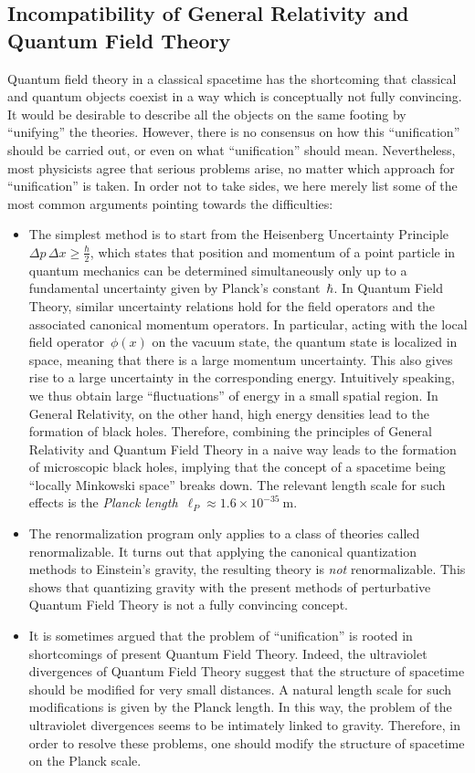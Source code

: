 \documentclass[reqno,11pt]{amsart}
\numberwithin{equation}{section}
\newcommand{\1}{\mbox{\rm 1 \hspace{-1.05 em} 1}}
\newcommand{\bitem}{\begin{itemize}[leftmargin=2.5em]}
\newcommand{\eitem}{\end{itemize}}
\newcommand{\itemD}{\item[{\raisebox{0.125em}{\tiny $\blacktriangleright$}}]}
\begin{document}
\subsection{Incompatibility of General Relativity and Quantum Field Theory} \label{secinconsist}
Quantum field theory in a classical spacetime has the shortcoming that
classical and quantum objects coexist in a way which is conceptually not fully convincing.
It would be desirable to describe all the objects on the same footing
by ``unifying'' the theories. However, there is no consensus on how this
``unification'' should be carried out,
or even on what ``unification'' should mean.
Nevertheless, most physicists agree that serious problems arise,
no matter which approach for ``unification'' is taken.
In order not to take sides, we here merely list some of the most common
arguments pointing towards the difficulties:
\bitem
\itemD The simplest method is to start from the Heisenberg Uncertainty Principle
$\Delta p \, \Delta x \geq \frac{\hbar}{2}$, which states that position and
momentum of a point particle in quantum mechanics can be determined
simultaneously only up to a fundamental uncertainty given by Planck's
constant~$\hbar$. In Quantum Field Theory, similar uncertainty relations hold
for the field operators and the associated canonical momentum operators. In particular,
acting with the local field operator~$\phi(x)$ on the vacuum state,
the quantum state is localized in space, meaning that there is
a large momentum uncertainty. This also gives rise to a large
uncertainty in the corresponding energy. Intuitively speaking, we thus obtain
large ``fluctuations'' of energy in a small spatial region.
In General Relativity, on the other hand, high energy densities lead to
the formation of black holes. Therefore, combining the principles
of General Relativity and Quantum Field Theory in a naive way
leads to the formation of microscopic black holes, implying that the
concept of a spacetime being ``locally Minkowski space'' breaks down.
The relevant length scale for such effects is the 
{\em{Planck length}}~$\ell_P \approx 1.6 \times 10^{-35}\ \mathrm{m}$.
\itemD  The renormalization program only applies to a class of theories called renormalizable.
It turns out that applying the canonical quantization methods
to Einstein's gravity, the resulting theory is {\em{not}} renormalizable.
This shows that quantizing gravity with the present methods of perturbative Quantum Field Theory 
is not a fully convincing concept.
\itemD It is sometimes argued that the problem of ``unification''
is rooted in shortcomings of present Quantum Field Theory.
Indeed, the ultraviolet divergences of Quantum Field Theory
suggest that the structure of spacetime should be modified for very small
distances. A natural length scale for such modifications is given by the
Planck length. In this way, the problem of the ultraviolet divergences seems to
be intimately linked to gravity.
Therefore, in order to resolve these problems, one should modify the
structure of spacetime on the Planck scale.
\eitem
\end{document}
